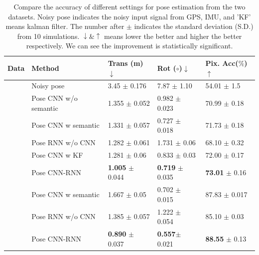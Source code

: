 \begin{table}
\vspace{-0\baselineskip}
\center
\fontsize{6.5}{7}\selectfont
\hspace*{-0.23cm}
\begin{tabular}{lllll}
\toprule[0.1 em]
Data & Method & Trans (m) $\downarrow$ & Rot ($\circ$)$\downarrow$  & Pix. Acc($\%$)$\uparrow$ \\
\hline
\parbox[t]{2mm}{} & Noisy pose & 3.45 $\pm$ 0.176 & 7.87 $\pm$ 1.10 & 54.01 $\pm$ 1.5 \\
& Pose CNN w/o semantic & 1.355 $\pm$ 0.052  & 0.982 $\pm$ 0.023 & 70.99 $\pm$ 0.18 \\
& Pose CNN w semantic & 1.331 $\pm$ 0.057  & 0.727 $\pm$ 0.018 & 71.73 $\pm$ 0.18  \\
& Pose RNN w/o CNN & 1.282 $\pm$ 0.061  & 1.731 $\pm$ 0.06 &  68.10 $\pm$ 0.32 \\
& Pose CNN w KF & 1.281 $\pm$ 0.06  & 0.833 $\pm$ 0.03 & 72.00 $\pm$ 0.17  \\
& Pose CNN-RNN  & \textbf{1.005} $\pm$ 0.044  & \textbf{0.719} $\pm$ 0.035  & \textbf{73.01} $\pm$ 0.16  \\
\toprule[0.1 em]
\hline
\parbox[t]{1mm}{} & Pose CNN w semantic & 1.667 $\pm$ 0.05 & 0.702 $\pm$ 0.015 & 87.83 $\pm$ 0.017 \\
& Pose RNN w/o CNN & 1.385 $\pm$ 0.057 & 1.222 $\pm$ 0.054 & 85.10 $\pm$ 0.03\\
& Pose CNN-RNN  & \textbf{0.890} $\pm$ 0.037  & \textbf{0.557}$\pm$ 0.021 & \textbf{88.55} $\pm$ 0.13  \\
\toprule[0.1 em]
\end{tabular}
\caption{Compare the accuracy of different settings for pose estimation from the two datasets.
Noisy pose indicates the noisy input signal from GPS, IMU, and 'KF' means kalman filter.
The number after $\pm$ indicates the standard deviation (S.D.) from 10 simulations. $\downarrow \& \uparrow$ means lower the better and higher the better respectively. 
We can see the improvement is statistically significant.}
\label{tbl:pose}
\vspace{-2.5\baselineskip}
\end{table}


